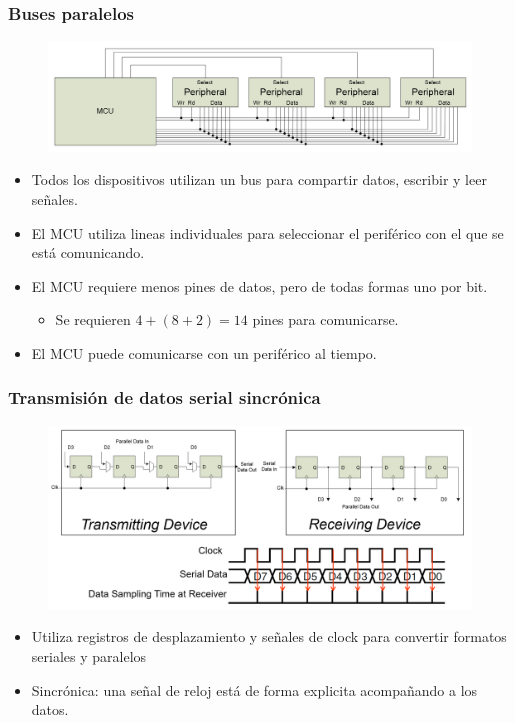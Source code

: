 \documentclass[10.5pt,scale=1.0,t,aspectratio=169,hyperref={pdfpagelabels=false}]{beamer}
\begin{document}
\begin{frame}
	\frametitle{Buses paralelos}
	
	\begin{figure}
		\centering
		\includegraphics[scale=0.4]{03_BusParalell}
	\end{figure}
	
	\begin{itemize}
		\item Todos los dispositivos utilizan un bus para compartir datos, escribir y leer señales.
		\item El MCU utiliza lineas individuales para seleccionar el periférico con el que se está comunicando.
		\item El MCU requiere menos pines de datos, pero de todas formas uno por bit.
		\begin{itemize}
			\item Se requieren $4+(8+2)=14$ pines para comunicarse.
		\end{itemize}
		\item El MCU puede comunicarse con un periférico al tiempo. 
	\end{itemize}
	
\end{frame}

\begin{frame}
	\frametitle{Transmisión de datos serial sincrónica}
	
	\begin{figure}
		\centering
		\includegraphics[scale=0.4]{04_SyncSerial}
	\end{figure}
	
	\begin{itemize}
		\item Utiliza registros de desplazamiento y señales de clock para convertir formatos seriales y paralelos
		\item Sincrónica: una señal de reloj está de forma explicita acompañando a los datos. 
	\end{itemize}
	
\end{frame}
\end{document}
